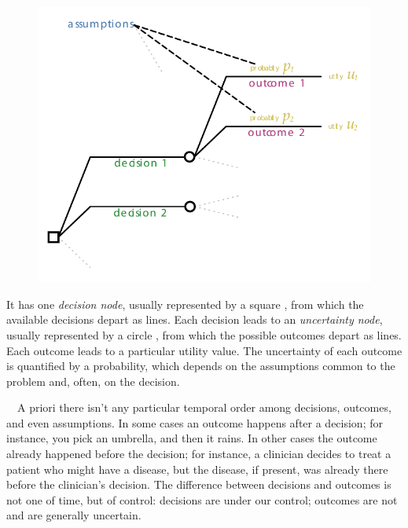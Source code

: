 \documentclass[
  a4paper,
  DIV=11,
  numbers=noendperiod,
  oneside]{scrreprt}
\begin{document}
\begin{figure}

{\centering \includegraphics[width=1\textwidth,height=\textheight]{index_files/mediabag/assembly_tree.pdf}

}

\end{figure}

It has one \emph{decision node}, usually represented by a square
, from which the available decisions depart as lines.
Each decision leads to an \emph{uncertainty node}, usually represented
by a circle , from which the possible outcomes depart as
lines. Each outcome leads to a particular utility value. The uncertainty
of each outcome is quantified by a probability, which depends on the
assumptions common to the problem and, often, on the decision.

~~A priori there isn't any particular
temporal order among decisions, outcomes, and even assumptions. In some
cases an outcome happens after a decision; for instance, you pick an
umbrella, and then it rains. In other cases the outcome already happened
before the decision; for instance, a clinician decides to treat a
patient who might have a disease, but the disease, if present, was
already there before the clinician's decision. The difference between
decisions and outcomes is not one of time, but of control: decisions are
under our control; outcomes are not and are generally uncertain.
\end{document}
